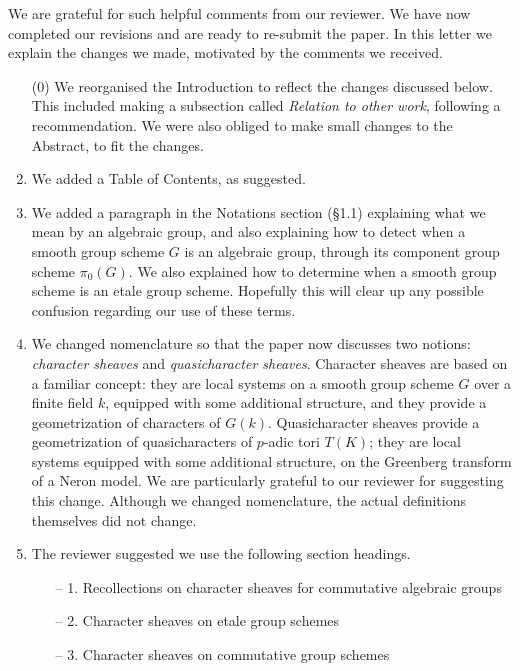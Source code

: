 \documentclass[a4, 10pt]{amsart}
\theoremstyle{definition}
\theoremstyle{remark}
\begin{document}
\rightline{\today}
\medskip

\medskip

We are grateful for such helpful comments from our reviewer. 
We have now completed our revisions and are ready to re-submit the paper. 
In this letter we explain the changes we made, motivated by the comments we received.

\begin{enumerate}
\item[(0)]
We reorganised the Introduction to reflect the changes discussed below. This included making a subsection called {\it Relation to other work}, following a recommendation.
We were also obliged to make small changes to the Abstract, to fit the changes.
\item
We added a Table of Contents, as suggested.
\item 
We added a paragraph in the Notations section (\S 1.1) explaining what we mean by an algebraic group, and also explaining how to detect when a smooth group scheme $G$ is an algebraic group, through its component group scheme $\pi_0(G)$.
We also explained how to determine when a smooth group scheme is an etale group scheme.
Hopefully this will clear up any possible confusion regarding our use of these terms.
\item
We changed nomenclature so that the paper now discusses two notions: {\it character sheaves} and {\it quasicharacter sheaves}. Character sheaves are based on a familiar concept: they are local systems on a smooth group scheme $G$ over a finite field $k$, equipped with some additional structure, and they provide a geometrization of characters of $G(k)$.  Quasicharacter sheaves provide a geometrization of quasicharacters of $p$-adic tori $T(K)$; they are local systems equipped with some additional structure, on the Greenberg transform of a Neron model. 
We are particularly grateful to our reviewer for suggesting this change.
Although we changed nomenclature, the actual definitions themselves did not change.
\item
The reviewer suggested we use the following section headings.
\begin{enumerate}
\item[– 1.] Recollections on character sheaves for commutative algebraic groups 
\item[– 2.] Character sheaves on etale group schemes
\item[– 3.] Character sheaves on commutative group schemes

\end{enumerate}
\end{enumerate}
\end{document}
